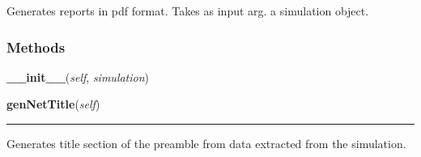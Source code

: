     \label{Epigrass:report:report}
Generates reports in pdf format. Takes as input arg. a simulation object.



  \subsubsection{Methods}

    \label{Epigrass:report:report:__init__}

    \vspace{0.5ex}

    \begin{boxedminipage}{\textwidth}

    \raggedright \textbf{\_\_init\_\_}(\textit{self}, \textit{simulation})

    \end{boxedminipage}

    \label{Epigrass:report:report:genNetTitle}

    \vspace{0.5ex}

    \begin{boxedminipage}{\textwidth}

    \raggedright \textbf{genNetTitle}(\textit{self})

    \vspace{-1.5ex}

    \rule{\textwidth}{0.5\fboxrule}
    Generates title section of the preamble from data extracted from the 
    simulation.

    \vspace{1ex}

    \end{boxedminipage}

    \label{Epigrass:report:report:genEpiTitle}

